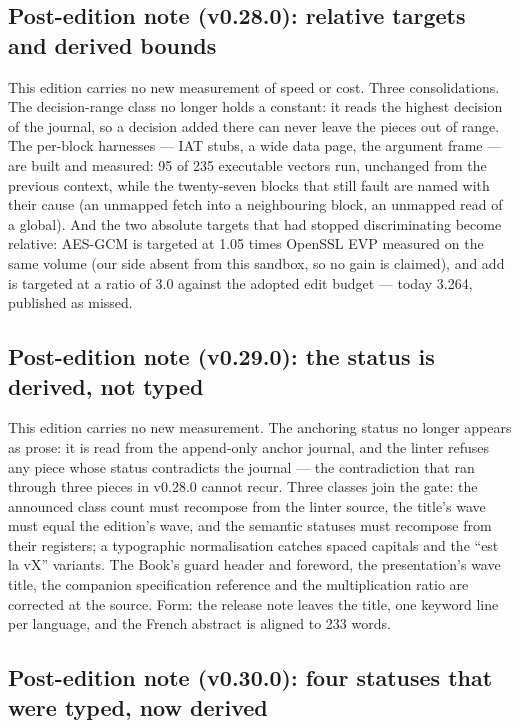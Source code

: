 \documentclass[10pt,a4paper]{article}
\begin{document}
\subsection{Post-edition note (v0.28.0): relative targets and derived bounds}

This edition carries no new measurement of speed or cost. Three consolidations. The
decision-range class no longer holds a constant: it reads the highest decision of the journal,
so a decision added there can never leave the pieces out of range. The per-block harnesses ---
IAT stubs, a wide data page, the argument frame --- are built and measured: 95 of 235
executable vectors run, unchanged from the previous context, while the twenty-seven blocks
that still fault are named with their cause (an unmapped fetch into a neighbouring block, an
unmapped read of a global). And the two absolute targets that had stopped discriminating
become relative: AES-GCM is targeted at 1.05 times OpenSSL EVP measured on the same volume
(our side absent from this sandbox, so no gain is claimed), and add is targeted at a ratio of
3.0 against the adopted edit budget --- today 3.264, published as missed.


\subsection{Post-edition note (v0.29.0): the status is derived, not typed}

This edition carries no new measurement. The anchoring status no longer appears as prose: it is
read from the append-only anchor journal, and the linter refuses any piece whose status
contradicts the journal --- the contradiction that ran through three pieces in v0.28.0 cannot
recur. Three classes join the gate: the announced class count must recompose from the linter
source, the title's wave must equal the edition's wave, and the semantic statuses must recompose
from their registers; a typographic normalisation catches spaced capitals and the ``est la vX''
variants. The Book's guard header and foreword, the presentation's wave title, the companion
specification reference and the multiplication ratio are corrected at the source. Form: the
release note leaves the title, one keyword line per language, and the French abstract is
aligned to 233 words.


\subsection{Post-edition note (v0.30.0): four statuses that were typed, now derived}
\end{document}
